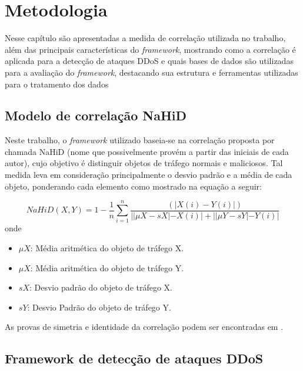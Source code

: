 \chapter[Metodologia]{Metodologia}
\label{metodologia}
Nesse capítulo são apresentadas a medida de correlação utilizada no trabalho, além das principais características do \textit{framework}, mostrando como a correlação é aplicada
para a detecção de ataques DDoS e quais bases de dados são utilizadas para a avaliação do \textit{framework}, destacando sua estrutura e ferramentas utilizadas para o tratamento dos dados

\section{Modelo de correlação NaHiD}

Neste trabalho, o \textit{framework} utilizado baseia-se na correlação proposta por \cite{HOQUE201748} chamada NaHiD (nome que possivelmente provém a partir das iniciais de cada autor), cujo objetivo é distinguir objetos de tráfego normais e maliciosos. Tal medida leva em consideração principalmente o desvio padrão e a média de cada objeto, ponderando cada elemento como mostrado na equação a seguir:  

\begin{equation}
	NaHiD(X,Y) = 1 - \frac{1}{n} \sum_{i=1}^{n} \frac{\left(|X(i) -	 Y(i)|\right)}{||\mu{X} - sX| - X(i)| + ||\mu{Y} - sY| - Y(i)|}
\end{equation}
onde
\begin{itemize}
	\item $\mu{X}$: Média aritmética do objeto de tráfego X.
 	\item $\mu{X}$: Média aritmética do objeto de tráfego Y.
	\item $sX$: Desvio padrão do objeto de tráfego X.
	\item $sY$: Desvio Padrão do objeto de tráfego Y.
\end{itemize}
As provas de simetria e identidade da correlação podem ser encontradas em \cite{HOQUE201748}.

\section{Framework de detecção de ataques DDoS}


